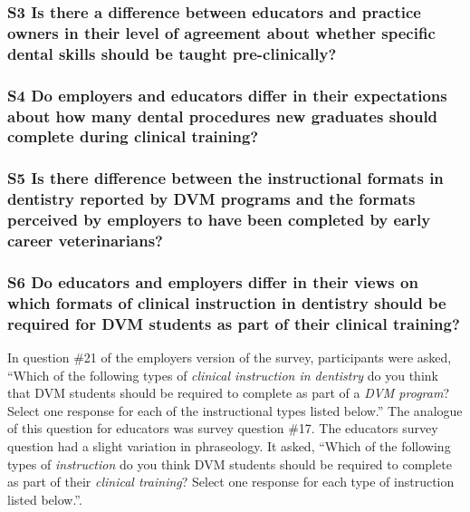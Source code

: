 \documentclass[
  11pt,
  letterpaper,
  DIV=11,
  numbers=noendperiod]{scrartcl}
\begin{document}
\subsubsection{S3 Is there a difference between educators and practice
owners in their level of agreement about whether specific dental skills
should be taught
pre-clinically?}\label{s3-is-there-a-difference-between-educators-and-practice-owners-in-their-level-of-agreement-about-whether-specific-dental-skills-should-be-taught-pre-clinically}

\subsubsection{S4 Do employers and educators differ in their
expectations about how many dental procedures new graduates should
complete during clinical
training?}\label{s4-do-employers-and-educators-differ-in-their-expectations-about-how-many-dental-procedures-new-graduates-should-complete-during-clinical-training}

\subsubsection{S5 Is there difference between the instructional formats
in dentistry reported by DVM programs and the formats perceived by
employers to have been completed by early career
veterinarians?}\label{s5-is-there-difference-between-the-instructional-formats-in-dentistry-reported-by-dvm-programs-and-the-formats-perceived-by-employers-to-have-been-completed-by-early-career-veterinarians}

\subsubsection{S6 Do educators and employers differ in their views on
which formats of clinical instruction in dentistry should be required
for DVM students as part of their clinical
training?}\label{s6-do-educators-and-employers-differ-in-their-views-on-which-formats-of-clinical-instruction-in-dentistry-should-be-required-for-dvm-students-as-part-of-their-clinical-training}

In question \#21 of the employers version of the survey, participants
were asked, ``Which of the following types of \emph{clinical instruction
in dentistry} do you think that DVM students should be required to
complete as part of a \emph{DVM program}? Select one response for each
of the instructional types listed below.'' The analogue of this question
for educators was survey question \#17. The educators survey question
had a slight variation in phraseology. It asked, ``Which of the
following types of \emph{instruction} do you think DVM students should
be required to complete as part of their \emph{clinical training}?
Select one response for each type of instruction listed below.''.
\end{document}
